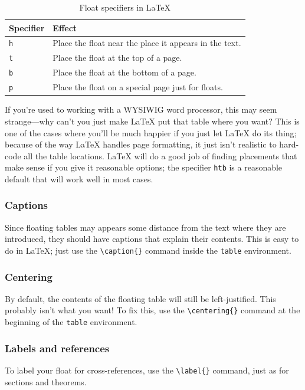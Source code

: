 \documentclass{article}
\newcommand*{\code}[1]{\texttt{#1}}
\begin{document}
\begin{table}[htb]
  \centering{}
  \begin{tabular}{l l}
    \toprule
    Specifier & Effect \\
    \midrule
    \code{h} & Place the float near the place it appears in the text. \\
    \code{t} & Place the float at the top of a page. \\
    \code{b} & Place the float at the bottom of a page. \\
    \code{p} & Place the float on a special page just for floats. \\
    \bottomrule
  \end{tabular}
  \caption{Float specifiers in \LaTeX{}}
  \label{tab:floatspecs}
\end{table}

If you're used to working with a WYSIWIG word processor, this may seem strange---why can't you just make \LaTeX{} put that table where you want?
This is one of the cases where you'll be much happier if you just let \LaTeX{} do its thing; because of the way \LaTeX{} handles page formatting, it just isn't realistic to hard-code all the table locations.
\LaTeX{} will do a good job of finding placements that make sense if you give it reasonable options; the specifier \code{htb} is a reasonable default that will work well in most cases.

\subsubsection{Captions}
\label{s:captions}
Since floating tables may appears some distance from the text where they are introduced, they should have captions that explain their contents.
This is easy to do in \LaTeX{}; just use the \code{\textbackslash{}caption\{\}} command inside the \code{table} environment.

\subsubsection{Centering}
\label{s:floatcenter}
By default, the contents of the floating table will still be left-justified.
This probably isn't what you want!
To fix this, use the \code{\textbackslash{}centering\{\}} command at the beginning of the \code{table} environment.

\subsubsection{Labels and references}
\label{s:floatlabel}
To label your float for cross-references, use the \code{\textbackslash{}label\{\}} command, just as for sections and theorems.
\end{document}
